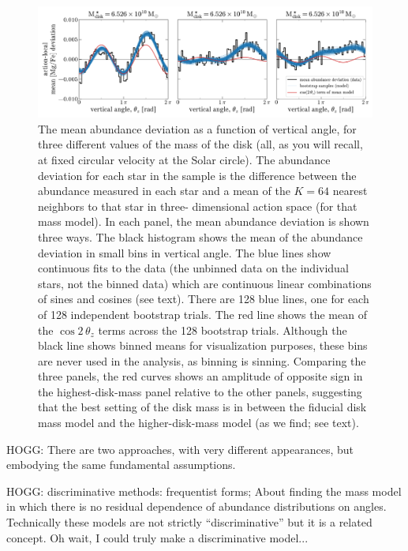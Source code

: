 \documentclass[modern]{aastex63}
\begin{document}
\begin{figure}[!tp]
  \begin{center}
  \includegraphics[width=\textwidth]{sinusoid-fits.pdf}
  \end{center}
  \caption{%
    The mean abundance deviation as a function of vertical angle, for three
    different values of the mass of the disk (all, as you will recall, at fixed
    circular velocity at the Solar circle).
    The abundance deviation for each star in the sample
    is the difference between the abundance measured in
    each star and a mean of the $K=64$ nearest neighbors to that star in three-
    dimensional action space (for that mass model).
    In each panel, the mean abundance deviation is shown three ways. The black
    histogram shows the mean of the abundance deviation in small bins in vertical
    angle.
    The blue lines show continuous fits to the data (the unbinned data on the
    individual stars, not the binned data) which are continuous linear combinations of
    sines and cosines (see text). There are 128 blue lines, one for each of
    128 independent bootstrap trials.
    The red line shows the mean of the $\cos 2\,\theta_z$ terms across the
    128 bootstrap trials.
    Although the black line shows binned means for visualization purposes,
    these bins are never used in the analysis, as binning is sinning.
    Comparing the three panels, the red curves
    shows an amplitude of opposite sign in the highest-disk-mass panel relative to
    the other panels, suggesting that
    the best setting of the disk mass is in between the fiducial disk mass model
    and the higher-disk-mass model (as we find; see text).
  \label{fig:sinusoid-fits}
  }
\end{figure}

HOGG: There are two approaches, with very different appearances, but
embodying the same fundamental assumptions.

HOGG: discriminative methods: frequentist forms; About finding the mass model in which
there is no residual dependence of abundance distributions on angles.
Technically these models are not strictly ``discriminative'' but it is a related
concept. Oh wait, I could truly make a discriminative model...
\end{document}
